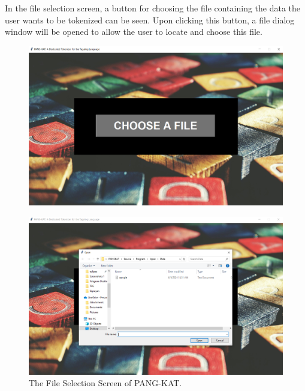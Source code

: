 \documentclass[journal]{./IEEE/IEEEtran}
\begin{document}
In the file selection screen, a button for choosing the file containing the data the user wants to be tokenized can be seen. Upon clicking this button, a file dialog window will be opened to allow the user to locate and choose this file.

\begin{figure}[H]
    \centering
    \includegraphics[scale=0.27]{images/File Selection Screen 1.png}
\end{figure}

\begin{figure}[H]
    \centering
    \includegraphics[scale=0.27]{images/File Selection Screen 2.png}
    \captionsetup{justification=centering}
    \caption{The File Selection Screen of PANG-KAT.}
\end{figure}
\end{document}
